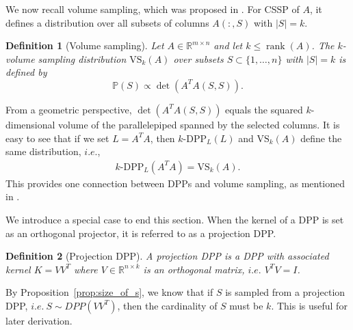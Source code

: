 \documentclass[11pt]{article}
\newtheorem{definition}{Definition}[section]
\newcommand{\be}{\begin{eqnarray}}
\newcommand{\ee}{\end{eqnarray}}
\newcommand{\R}{\mathbb{R}}
\newcommand{\<}{\langle}
\renewcommand{\>}{\rangle}
\begin{document}
We now recall volume sampling, which was proposed in \cite{volume_sampling1}. For CSSP of $A$, it defines a distribution over all subsets of columns $A(:,S)$ with $|S| = k.$

\begin{definition}[Volume sampling]
Let $A \in \mathbb{R}^{m\times n}$ and let $k \le \operatorname{rank}(A)$. 
The $k$-volume sampling distribution $\mathrm{VS}_k(A)$ over subsets 
$S \subset \{1,\dots,n\}$ with $|S|=k$ is defined by
\[
\mathbb{P}(S) \propto \det(A^T A(S,S)).
\]
\end{definition}

From a geometric perspective, $\det(A^TA(S,S))$ equals the squared $k$-dimensional volume 
of the parallelepiped spanned by the selected columns. It is easy to see that 
if we set $L = A^T A$, then $k$-$\mathrm{DPP}_L(L)$ and $\mathrm{VS}_k(A)$ define 
the same distribution, $i.e. $,
\be
k\text{-}\mathrm{DPP}_L(A^TA) = \mathrm{VS}_k(A).
\ee
This provides one connection between DPPs and volume sampling, as mentioned in \cite{epperly2026adaptiverandomizedpivotingvolume}. 

We introduce a special case to end this section. When the kernel of a DPP is set as an orthogonal projector, it is referred to as a projection DPP. 

\begin{definition}[Projection DPP]
A projection DPP is a DPP with associated kernel $K = VV^T$ where $V\in \R^{n\times k}$ is an orthogonal matrix, $i.e.$ $V^TV = I$. 
\end{definition}

By Proposition~\ref{prop:size_of_s}, we know that if $S$ is sampled from a projection DPP, $i.e.\ S\sim DPP(VV^T)$, then the cardinality of $S$ must be $k$. This is useful for later derivation.
\end{document}
